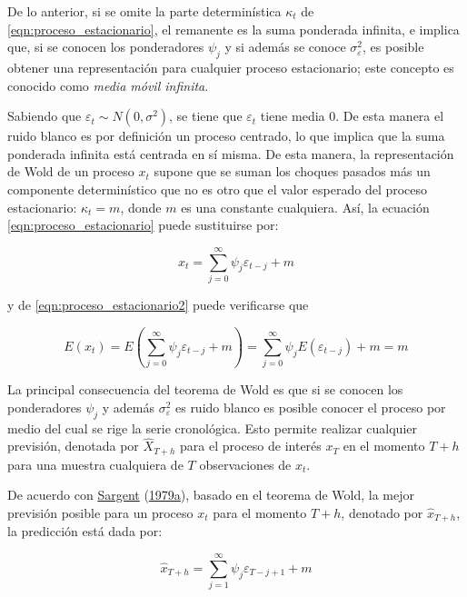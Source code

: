 \documentclass[
]{article}
\begin{document}
De lo anterior, si se omite la parte determinística \(\kappa_t\) de
\eqref{eqn:proceso_estacionario}, el remanente es la suma ponderada
infinita, e implica que, si se conocen los ponderadores \(\psi_j\) y si
además se conoce \(\sigma_\varepsilon^2\), es posible obtener una
representación para cualquier proceso estacionario; este concepto es
conocido como \emph{media móvil infinita}.

Sabiendo que \(\varepsilon_t \sim N(0, \sigma^2)\), se tiene que
\(\varepsilon_t\) tiene media 0. De esta manera el ruido blanco es por
definición un proceso centrado, lo que implica que la suma ponderada
infinita está centrada en sí misma. De esta manera, la representación de
Wold de un proceso \(x_t\) supone que se suman los choques pasados más
un componente determinístico que no es otro que el valor esperado del
proceso estacionario: \(\kappa_t=m\), donde \(m\) es una constante
cualquiera. Así, la ecuación \eqref{eqn:proceso_estacionario} puede
sustituirse por:

\begin{equation}
\label{eqn:proceso_estacionario2}
x_t=\sum_{j=0}^{\infty} \psi_j\varepsilon_{t-j}+m
\end{equation}

y de \eqref{eqn:proceso_estacionario2} puede verificarse que

\begin{equation}
\label{eqn:dem_proceso_estacionario2}
E(x_t)=E\left(\sum_{j=0}^{\infty} \psi_j\varepsilon_{t-j}+m\right)=\sum_{j=0}^{\infty} \psi_jE\left(\varepsilon_{t-j}\right) + m = m
\end{equation}

La principal consecuencia del teorema de Wold es que si se conocen los
ponderadores \(\psi_j\) y además \(\sigma_\varepsilon^2\) es ruido
blanco es posible conocer el proceso por medio del cual se rige la serie
cronológica. Esto permite realizar cualquier previsión, denotada por
\(\hat X_{T+h}\) para el proceso de interés \(x_T\) en el momento
\(T+h\) para una muestra cualquiera de \(T\) observaciones de \(x_t\).

De acuerdo con \protect\hyperlink{ref-sargent_macro}{Sargent}
(\protect\hyperlink{ref-sargent_macro}{1979a}), basado en el teorema de
Wold, la mejor previsión posible para un proceso \(x_t\) para el momento
\(T+h\), denotado por \(\hat x_{T+h}\), la predicción está dada por:

\begin{equation}
\label{eqn:prevision}
\hat x_{T+h}=\sum_{j=1}^{\infty} \psi_j \varepsilon_{T-j+1}+m
\end{equation}
\end{document}
